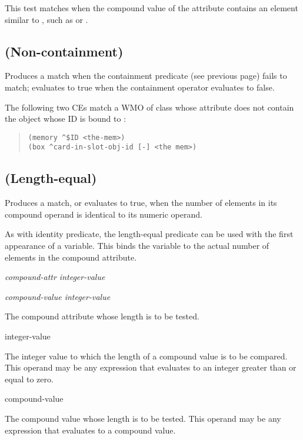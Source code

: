 This test matches when the compound value of the \ct{}
attribute contains an element similar to , such as
 or .

\subsection{\co{[-]} (Non-containment)}

Produces a match when the containment predicate (see previous
page) fails to match; evaluates to true when the containment
operator evaluates to false.

\Example

The following two CEs match a WMO of class  whose
\ct{} attribute does not contain the object
whose ID is bound to :

\begin{quote}
\begin{verbatim}
(memory ^$ID <the-mem>)
(box ^card-in-slot-obj-id [-] <the mem>)
\end{verbatim}
\end{quote}

\subsection{\co{[=]} (Length-equal)}

Produces a match, or evaluates to true, when the number of elements in
its compound operand is identical to its numeric operand.

As with identity predicate, the length-equal predicate can be used
with the first appearance of a variable. This binds the variable to
the actual number of elements in the compound attribute.

\Format

\ct\it{compound-attr} \co{[=]} \it{integer-value}

\it{compound-value} \co{[=]} \it{integer-value}

\begin{operands}
\item[\ct{compound-attr}]

  The compound attribute whose length is to be tested.

\item[integer-value]

  The integer value to which the length of a compound value is to be
  compared. This operand may be any expression that evaluates to an
  integer greater than or equal to zero.

\item[compound-value]

  The compound value whose length is to be tested. This operand may be
  any expression that evaluates to a compound value.
\end{operands}

